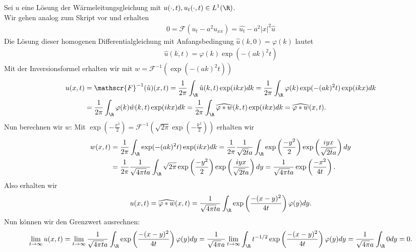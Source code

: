 \begin{solution}

Sei $u$ eine Lösung der Wärmeleitungsgleichung mit $u(\cdot,t), u_t(\cdot,t) \in L^1(\R)$. \\
Wir gehen analog zum Skript vor und erhalten
\begin{align*}
0 = \mathscr{F}(u_t - a^2u_{xx}) = \hat{u_t} - a^2|x|^2\hat{u}
\end{align*}
Die Lösung dieser homogenen Differentialgleichung mit Anfangsbedingung $\hat{u}(k,0) = \varphi(k)$ lautet
\begin{align*}
  \hat{u}(k,t) = \varphi(k)\exp(-(ak)^2t)
\end{align*}
Mit der Inversionsformel erhalten wir mit $w = \mathscr{F}^{-1}(\exp(-(ak)^2t))$
\begin{align*}
  u(x,t) &= \mathscr{F}^{-1}(\hat{u})(x,t) = \frac{1}{2\pi}\int_\R \hat{u}(k,t)\exp(ikx)dk
  = \frac{1}{2\pi}\int_\R \varphi(k)\exp(-(ak)^2t)\exp(ikx)dk \\
  &= \frac{1}{2\pi}\int_\R \varphi(k)\hat{w}(k,t)\exp(ikx)dk
  = \frac{1}{2\pi}\int_\R \widehat{\varphi \ast w}(k,t)\exp(ikx)dk
  = \widehat{\varphi \ast w}(x,t).
\end{align*}
Nun berechnen wir $w$: Mit
$\exp(-\frac{x^2}{2}) = \mathscr{F}^{-1}\left(\sqrt{2\pi}\exp\left(-\frac{k^2}{2}\right)\right)$
erhalten wir
\begin{align*}
  w(x,t) &= \frac{1}{2\pi}\int_\R \exp(-(ak)^2t)\exp(ikx) dk
  = \frac{1}{2\pi}\frac{1}{\sqrt{2t}a}\int_\R \exp\left(\frac{-y^2}{2}\right)
  \exp\left(\frac{iyx}{\sqrt{2t}a}\right) dy \\
  &= \frac{1}{2\pi}\frac{1}{\sqrt{4\pi t}a}\int_\R \sqrt{2\pi}\exp\left(\frac{-y^2}{2}\right)
  \exp\left(\frac{iyx}{\sqrt{2t}a}\right) dy
  = \frac{1}{\sqrt{4\pi t}a}\exp\left(\frac{-x^2}{4t}\right).
\end{align*}
Also erhalten wir
\begin{align}
  u(x,t) = \widehat{\varphi \ast w}(x,t) =
  \frac{1}{\sqrt{4\pi t}a}\int_\R \exp\left(\frac{-(x-y)^2}{4t}\right)\varphi(y) dy.
\end{align}
Nun können wir den Grenzwert ausrechnen:
\begin{align*}
  \lim_{t \to \infty} u(x,t) = \lim_{t \to \infty}
  \frac{1}{\sqrt{4\pi t}a}\int_\R \exp\left(\frac{-(x-y)^2}{4t}\right)\varphi(y) dy
  = \frac{1}{\sqrt{4\pi}a}\lim_{t \to \infty}
  \int_\R t^{-1/2}\exp\left(\frac{-(x-y)^2}{4t}\right)\varphi(y) dy
  = \frac{1}{\sqrt{4\pi}a}\int_\R 0 dy = 0.
\end{align*}
\end{solution}

